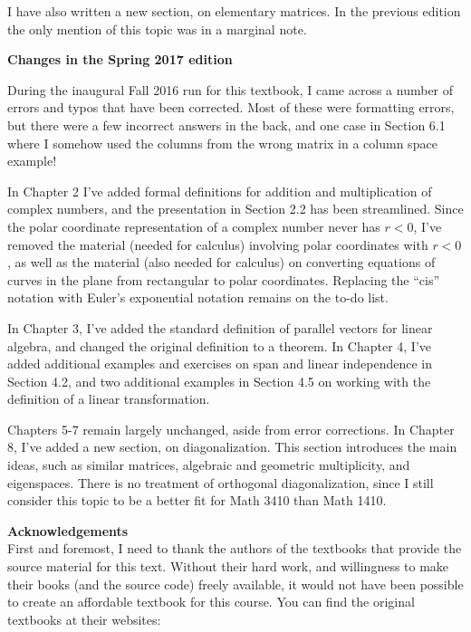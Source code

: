 I have also written a new section, on elementary matrices. In the previous edition the only mention of this topic was in a marginal note.

\bigskip

\bigskip


\noindent\textbf{\large Changes in the Spring 2017 edition}

During the inaugural Fall 2016 run for this textbook, I came across a number of errors and typos that have been corrected. Most of these were formatting errors, but there were a few incorrect answers in the back, and one case in Section 6.1 where I somehow used the columns from the wrong matrix in a column space example!

In Chapter 2 I've added formal definitions for addition and multiplication of complex numbers, and the presentation in Section 2.2 has been streamlined. Since the polar coordinate representation of a complex number never has $r<0$, I've removed the material (needed for calculus) involving polar coordinates with $r<0$, as well as the material (also needed for calculus) on converting equations of curves in the plane from rectangular to polar coordinates. Replacing the ``cis'' notation with Euler's exponential notation remains on the to-do list.

In Chapter 3, I've added the standard definition of parallel vectors for linear algebra, and changed the original definition to a theorem. In Chapter 4, I've added additional examples and exercises on span and linear independence in Section 4.2, and two additional examples in Section 4.5 on working with the definition of a linear transformation.

Chapters 5-7 remain largely unchanged, aside from error corrections. In Chapter 8, I've added a new section, on diagonalization. This section introduces the main ideas, such as similar matrices, algebraic and geometric multiplicity, and eigenspaces. There is no treatment of orthogonal diagonalization, since I still consider this topic to be a better fit for Math 3410 than Math 1410.

\pagebreak


\noindent\textbf{\large Acknowledgements}\\

First and foremost, I need to thank the authors of the textbooks that provide the source material for this text. Without their hard work, and willingness to make their books (and the source code) freely available, it would not have been possible to create an affordable textbook for this course. You can find the original textbooks at their websites:

